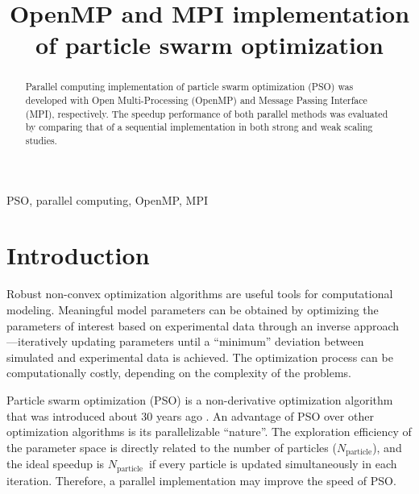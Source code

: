 \documentclass[conference, 10pt]{IEEEtran}
\newcommand{\N}[1]{\ensuremath{N_\text{#1}}}
\newcommand{\Np}{\N{particle}}
\begin{document}
\title{OpenMP and MPI implementation of particle swarm optimization}

 \author{
 }


\maketitle

\begin{abstract}
Parallel computing implementation of particle swarm optimization (PSO) was developed with Open Multi-Processing (OpenMP) and Message Passing Interface (MPI), respectively.
The speedup performance of both parallel methods was evaluated by comparing that of a sequential implementation in both strong and weak scaling studies. 


\end{abstract}

\begin{IEEEkeywords}
PSO, parallel computing, OpenMP, MPI
\end{IEEEkeywords}

\section{Introduction}
Robust non-convex optimization algorithms are useful tools for computational modeling.
Meaningful model parameters can be obtained by optimizing the parameters of interest based on experimental data through an inverse approach \cite{Zhao2021, Zhao_etal2022}---iteratively updating parameters until a ``minimum'' deviation between simulated and experimental data is achieved.
The optimization process can be computationally costly, depending on the complexity of the problems. 
 
Particle swarm optimization (PSO) is a non-derivative optimization algorithm that was introduced about 30 years ago \cite{Eberhart+Kennedy}.
An advantage of PSO over other optimization algorithms is its parallelizable ``nature''.  
The exploration efficiency of the parameter space is directly related to the number of particles (\Np), and the ideal speedup is \Np\ if every particle is updated simultaneously in each iteration. 
Therefore, a parallel implementation may improve the speed of PSO.  
\end{document}
